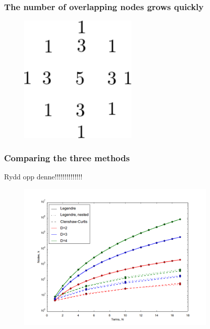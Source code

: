 \documentclass{beamer}
\begin{document}
\begin{frame}
 \frametitle{The number of overlapping nodes grows quickly}
 \begin{figure}
  \includegraphics[width=0.5\textwidth]{smolyak_nested_nr.png}
 \end{figure}

\end{frame}

%
%

 \begin{frame}
  \frametitle{Comparing the three methods}

Rydd opp denne!!!!!!!!!!!!!!

 \begin{figure}
  \includegraphics[width=0.85\textwidth]{dimensionality_nodes_nested.png}
 \end{figure}
 \end{frame}
\end{document}

